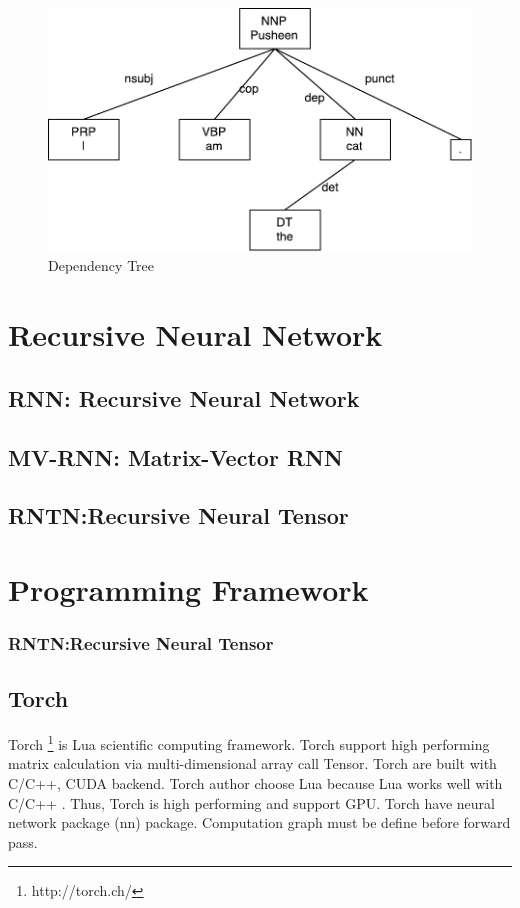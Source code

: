 \begin{figure}[H]
	\centering
	\includegraphics[width=0.7\linewidth]{figure/udexample}
	\caption[Dependency Tree]{Dependency Tree}
	\label{fig:udexample}
\end{figure}

\section{Recursive Neural Network}

\subsection{RNN: Recursive Neural Network}

\subsection{MV-RNN: Matrix-Vector RNN}

\subsection{RNTN:Recursive Neural Tensor}

\section{Programming Framework}
\subsubsection{RNTN:Recursive Neural Tensor}
\subsection{Torch}\label{sec:torch}
Torch \footnote{http://torch.ch/} is Lua scientific computing framework. Torch support high performing matrix calculation via multi-dimensional array call Tensor. Torch are built with C/C++, CUDA backend. Torch author choose Lua because Lua works well with C/C++ \cite{collobert2011torch7}.  Thus, Torch is high performing and support GPU. Torch have neural network package (nn) package. Computation graph must be define before forward pass.

